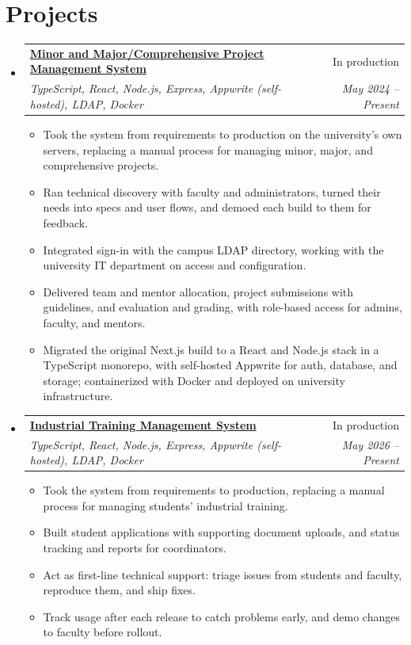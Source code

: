 \documentclass[a4paper,11pt]{article}
\makeatletter
\newcommand{\resumeSubheadingFull}[4]{
  \vspace{-1pt}\item
    \begin{tabular*}{0.97\textwidth}{l@{\extracolsep{\fill}}r}
    \textbf{#1} & #2 \\
    \textit{#3} & \textit{#4} \\
    \end{tabular*}\vspace{-5pt}
}
\newcommand{\resumeSubHeadingListStart}{\begin{itemize}[leftmargin=*]}
\newcommand{\resumeSubHeadingListEnd}{\end{itemize}}
\newcommand{\resumeItemListStart}{\begin{itemize}[itemsep=1pt,topsep=3pt]\small}
\newcommand{\resumeItemListEnd}{\end{itemize}\vspace{-3pt}}
\makeatother
\begin{document}
\section{Projects}
  \resumeSubHeadingListStart
    \resumeSubheadingFull{\href{https://portal.pdpu.ac.in}{Minor and Major/Comprehensive Project Management System}}{In production}
      {TypeScript, React, Node.js, Express, Appwrite (self-hosted), LDAP, Docker}{May 2024 -- Present}
      \resumeItemListStart
        \item Took the system from requirements to production on the university's own servers, replacing a manual process for managing minor, major, and comprehensive projects.
        \item Ran technical discovery with faculty and administrators, turned their needs into specs and user flows, and demoed each build to them for feedback.
        \item Integrated sign-in with the campus LDAP directory, working with the university IT department on access and configuration.
        \item Delivered team and mentor allocation, project submissions with guidelines, and evaluation and grading, with role-based access for admins, faculty, and mentors.
        \item Migrated the original Next.js build to a React and Node.js stack in a TypeScript monorepo, with self-hosted Appwrite for auth, database, and storage; containerized with Docker and deployed on university infrastructure.
      \resumeItemListEnd

    \resumeSubheadingFull{\href{https://portal.pdpu.ac.in}{Industrial Training Management System}}{In production}
      {TypeScript, React, Node.js, Express, Appwrite (self-hosted), LDAP, Docker}{May 2026 -- Present}
      \resumeItemListStart
        \item Took the system from requirements to production, replacing a manual process for managing students' industrial training.
        \item Built student applications with supporting document uploads, and status tracking and reports for coordinators.
        \item Act as first-line technical support: triage issues from students and faculty, reproduce them, and ship fixes.
        \item Track usage after each release to catch problems early, and demo changes to faculty before rollout.
      \resumeItemListEnd
  \resumeSubHeadingListEnd
\end{document}
